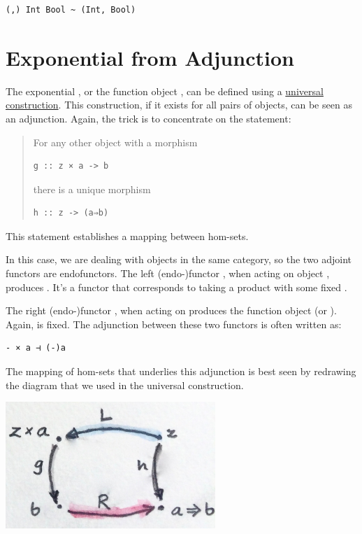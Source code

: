 \begin{verbatim}
(,) Int Bool ~ (Int, Bool)
\end{verbatim}

\section{Exponential from
Adjunction}\label{exponential-from-adjunction}

The exponential , or the function object , can be
defined using a
\href{https://bartoszmilewski.com/2015/03/13/function-types/}{universal
construction}. This construction, if it exists for all pairs of objects,
can be seen as an adjunction. Again, the trick is to concentrate on the
statement:

\begin{quote}
For any other object  with a morphism

\begin{verbatim}
g :: z × a -> b
\end{verbatim}

there is a unique morphism

\begin{verbatim}
h :: z -> (a⇒b)
\end{verbatim}
\end{quote}

This statement establishes a mapping between hom-sets.

In this case, we are dealing with objects in the same category, so the
two adjoint functors are endofunctors. The left (endo-)functor
, when acting on object , produces .
It's a functor that corresponds to taking a product with some fixed
.

The right (endo-)functor , when acting on  produces
the function object  (or ). Again,  is
fixed. The adjunction between these two functors is often written as:

\begin{verbatim}
- × a ⊣ (-)a
\end{verbatim}

The mapping of hom-sets that underlies this adjunction is best seen by
redrawing the diagram that we used in the universal construction.

\includegraphics[width=3.12500in]{images/adj-expo.jpg}

